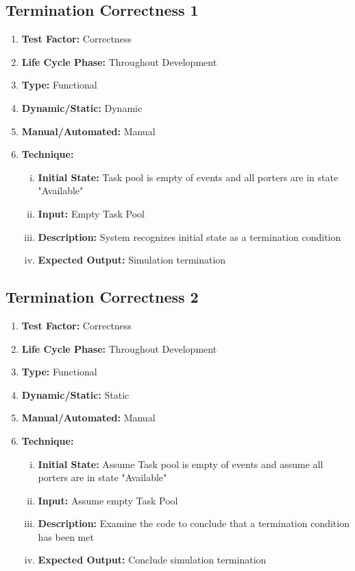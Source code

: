 \documentclass[paper=letter, fontsize=10pt]{scrartcl}
\numberwithin{equation}{section}		%
\numberwithin{figure}{section}			%
\numberwithin{table}{section}				%
\begin{document}
\subsection{Termination Correctness 1}
\begin{enumerate}[]
	\item \textbf{Test Factor:} Correctness
	\item \textbf{Life Cycle Phase:} Throughout Development
	\item \textbf{Type:} Functional
	\item \textbf{Dynamic/Static:} Dynamic
	\item \textbf{Manual/Automated:} Manual
	\item \textbf{Technique:}
		\begin{enumerate}[(i)]
			\item \textbf{Initial State:} Task pool is empty of events and all porters are in state "Available"  
			\item \textbf{Input:} Empty Task Pool
			\item \textbf{Description:} System recognizes initial state as a termination condition
			\item \textbf{Expected Output:} Simulation termination
		\end{enumerate}
\end{enumerate}

\subsection{Termination Correctness 2}
\begin{enumerate}[]
	\item \textbf{Test Factor:} Correctness
	\item \textbf{Life Cycle Phase:} Throughout Development
	\item \textbf{Type:} Functional
	\item \textbf{Dynamic/Static:} Static
	\item \textbf{Manual/Automated:} Manual
	\item \textbf{Technique:}
		\begin{enumerate}[(i)]
			\item \textbf{Initial State:} Assume Task pool is empty of events and assume all porters are in state "Available"  
			\item \textbf{Input:}  Assume empty Task Pool
			\item \textbf{Description:} Examine the code to conclude that a termination condition has been met 
			\item \textbf{Expected Output:} Conclude simulation termination
		\end{enumerate}
\end{enumerate}
\end{document}
